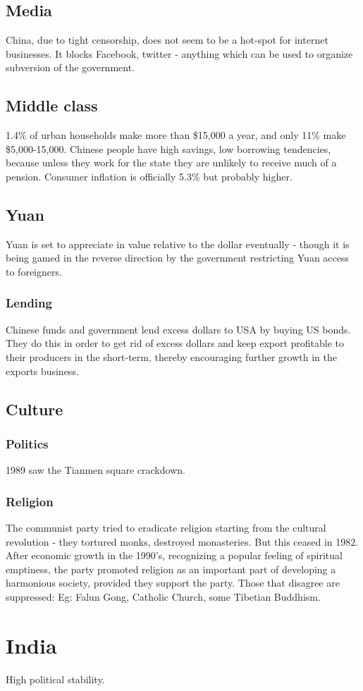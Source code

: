 \documentclass[oneside, article]{memoir}
\begin{document}
\section{Media}
China, due to tight censorship, does not seem to be a hot-spot for internet businesses. It blocks Facebook, twitter - anything which can be used to organize subversion of the government.

\section{Middle class}
1.4\% of urban households make more than \$15,000 a year, and only 11\% make \$5,000-15,000. Chinese people have high savings, low borrowing tendencies, because unless they work for the state they are unlikely to receive much of a pension. Consumer inflation is officially 5.3\% but probably higher.

\section{Yuan}
Yuan is set to appreciate in value relative to the dollar eventually - though it is being gamed in the reverse direction by the government restricting Yuan access to foreigners.

\subsection{Lending}
Chinese funds and government lend excess dollars to USA by buying US bonds. They do this in order to get rid of excess dollars and keep export profitable to their producers in the short-term, thereby encouraging further growth in the exports business.

\section{Culture}
\subsection{Politics}
1989 saw the Tianmen square crackdown.

\subsection{Religion}
The communist party tried to eradicate religion starting from the cultural revolution - they tortured monks, destroyed monasteries. But this ceased in 1982. After economic growth in the 1990's, recognizing a popular feeling of spiritual emptiness, the party promoted religion as an important part of developing a harmonious society, provided they support the party. Those that disagree are suppressed: Eg: Falun Gong, Catholic Church, some Tibetian Buddhism.

\chapter{India}
High political stability.

% 
% 
\end{document}
